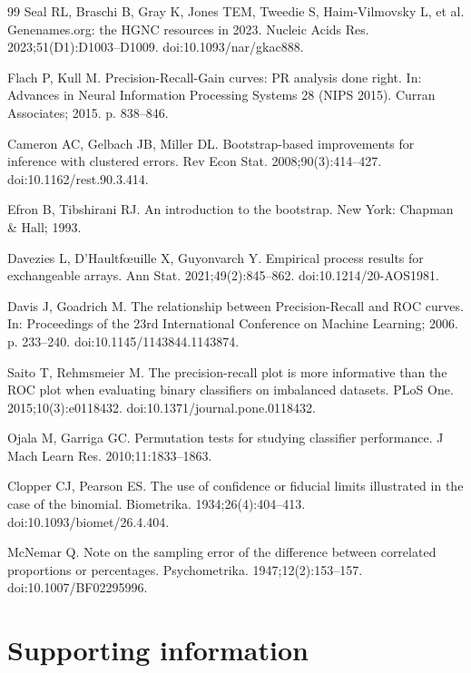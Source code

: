\documentclass[10pt,letterpaper]{article}
\begin{document}
\begin{thebibliography}{99}
Seal RL, Braschi B, Gray K, Jones TEM, Tweedie S, Haim-Vilmovsky L, et al. Genenames.org: the HGNC resources in 2023. Nucleic Acids Res. 2023;51(D1):D1003--D1009. doi:10.1093/nar/gkac888.

Flach P, Kull M. Precision-Recall-Gain curves: PR analysis done right. In: Advances in Neural Information Processing Systems 28 (NIPS 2015). Curran Associates; 2015. p. 838--846.

Cameron AC, Gelbach JB, Miller DL. Bootstrap-based improvements for inference with clustered errors. Rev Econ Stat. 2008;90(3):414--427. doi:10.1162/rest.90.3.414.

Efron B, Tibshirani RJ. An introduction to the bootstrap. New York: Chapman \& Hall; 1993.

Davezies L, D'Haultf\oe{}uille X, Guyonvarch Y. Empirical process results for exchangeable arrays. Ann Stat. 2021;49(2):845--862. doi:10.1214/20-AOS1981.

Davis J, Goadrich M. The relationship between Precision-Recall and ROC curves. In: Proceedings of the 23rd International Conference on Machine Learning; 2006. p. 233--240. doi:10.1145/1143844.1143874.

Saito T, Rehmsmeier M. The precision-recall plot is more informative than the ROC plot when evaluating binary classifiers on imbalanced datasets. PLoS One. 2015;10(3):e0118432. doi:10.1371/journal.pone.0118432.

Ojala M, Garriga GC. Permutation tests for studying classifier performance. J Mach Learn Res. 2010;11:1833--1863.

Clopper CJ, Pearson ES. The use of confidence or fiducial limits illustrated in the case of the binomial. Biometrika. 1934;26(4):404--413. doi:10.1093/biomet/26.4.404.

McNemar Q. Note on the sampling error of the difference between correlated proportions or percentages. Psychometrika. 1947;12(2):153--157. doi:10.1007/BF02295996.

\end{thebibliography}

\linenumbers
\section*{Supporting information}
\end{document}
